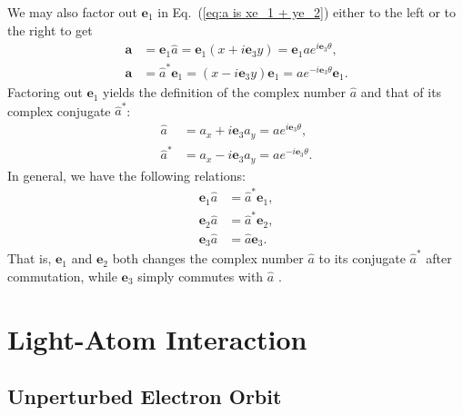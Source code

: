 \documentclass[twocolumn,showpacs,preprintnumbers,amsmath,amssymb]{revtex4}
\begin{document}
We may also factor out $\mathbf e_1$ in Eq.~(\ref{eq:a is xe_1 + ye_2}) either to the left or to the right to get
\begin{subequations}
\begin{align}
\mathbf a &= \mathbf e_1\hat a = \mathbf e_1(x +  i \mathbf e_3  y) = \mathbf e_1 ae^{ i \mathbf e_3 \theta},\\
\mathbf a &= \hat a^*\mathbf e_1 = (x -  i \mathbf e_3  y)\mathbf e_1 = ae^{- i \mathbf e_3 \theta}\mathbf e_1.
\end{align}
\end{subequations}
Factoring out $\mathbf e_1$ yields the definition of the complex number $\hat a$ and that of its complex conjugate $\hat a^*$:
\begin{subequations}
\begin{align}
\hat a &= a_x +  i \mathbf e_3  a_y = ae^{ i \mathbf e_3 \theta},\\
\hat a^* &= a_x -  i \mathbf e_3  a_y = ae^{- i \mathbf e_3 \theta}.
\end{align}
\end{subequations}
In general, we have the following relations:
\begin{subequations}
\begin{align}
\label{eq:e_1a is a*e_1}
\mathbf e_1\hat a &= \hat a^*\mathbf e_1,\\
\label{eq:e_2a is a*e_2}
\mathbf e_2\hat a &= \hat a^*\mathbf e_2,\\
\label{eq:e_3a is ae_3}
\mathbf e_3\hat a &= \hat a\mathbf e_3.
\end{align}
\end{subequations}
That is, $\mathbf e_1$ and $\mathbf e_2$ both changes the complex number $\hat a$ to its conjugate $\hat a^*$ after commutation, while $\mathbf e_3$ simply commutes with $\hat a$ \cite{jancewicz, geomaloptics, vold, hestenesoersted}.

\section{Light-Atom Interaction}

\subsection{Unperturbed Electron Orbit}
\end{document}
